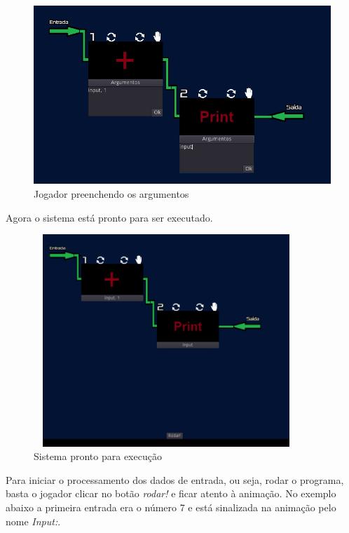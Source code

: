 \begin{figure}[H]
    \includegraphics[width=\textwidth]{../figuras/preenchendo_argumentos.png}
    \caption{Jogador preenchendo os argumentos}
\end{figure}

Agora o sistema está pronto para ser executado.

\begin{figure}[H]
    \includegraphics[width=100mm, height=80mm]{../figuras/sistema_pronto.png}
    \caption{Sistema pronto para execu\c{c}\~{a}o}
\end{figure}

Para iniciar o processamento dos dados de entrada, ou seja, rodar o programa,
basta o jogador clicar no botão \textit{rodar!} e ficar atento à animação.
No exemplo abaixo a primeira entrada era o número 7 e está sinalizada na 
animação pelo nome \textit{Input:}.


